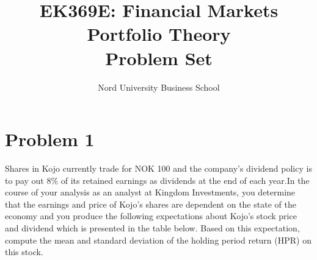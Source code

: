 \documentclass[12]{article}
\title{EK369E: Financial Markets\\ Portfolio Theory\\Problem Set }
\author{Nord University Business School}
\date{}
\begin{document}
\maketitle


\section*{Problem 1}
Shares in Kojo currently trade for NOK 100 and the company's dividend policy is to pay out 8\% of its retained earnings as dividends at the end of each year.In the course of your analysis as an analyst at Kingdom Investments, you determine that the earnings and price of Kojo's shares are dependent on the state of the economy and 
you produce the following expectations about Kojo's stock price and dividend which is presented in the table below. Based on this expectation, compute the mean and standard deviation of the holding period return (HPR) on this stock.

\begin{table}[H]
\label{tab:my-table}
\end{table}
\end{document}
